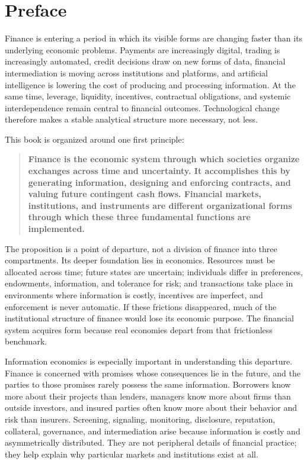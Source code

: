 \chapter*{Preface}

Finance is entering a period in which its visible forms are changing faster than its underlying economic problems. Payments are increasingly digital, trading is increasingly automated, credit decisions draw on new forms of data, financial intermediation is moving across institutions and platforms, and artificial intelligence is lowering the cost of producing and processing information. At the same time, leverage, liquidity, incentives, contractual obligations, and systemic interdependence remain central to financial outcomes. Technological change therefore makes a stable analytical structure more necessary, not less.

This book is organized around one first principle:

\begin{quote}
\textbf{Finance is the economic system through which societies organize exchanges across time and uncertainty. It accomplishes this by generating information, designing and enforcing contracts, and valuing future contingent cash flows. Financial markets, institutions, and instruments are different organizational forms through which these three fundamental functions are implemented.}
\end{quote}

The proposition is a point of departure, not a division of finance into three compartments. Its deeper foundation lies in economics. Resources must be allocated across time; future states are uncertain; individuals differ in preferences, endowments, information, and tolerance for risk; and transactions take place in environments where information is costly, incentives are imperfect, and enforcement is never automatic. If these frictions disappeared, much of the institutional structure of finance would lose its economic purpose. The financial system acquires form because real economies depart from that frictionless benchmark.

Information economics is especially important in understanding this departure. Finance is concerned with promises whose consequences lie in the future, and the parties to those promises rarely possess the same information. Borrowers know more about their projects than lenders, managers know more about firms than outside investors, and insured parties often know more about their behavior and risk than insurers. Screening, signaling, monitoring, disclosure, reputation, collateral, governance, and intermediation arise because information is costly and asymmetrically distributed. They are not peripheral details of financial practice; they help explain why particular markets and institutions exist at all.

